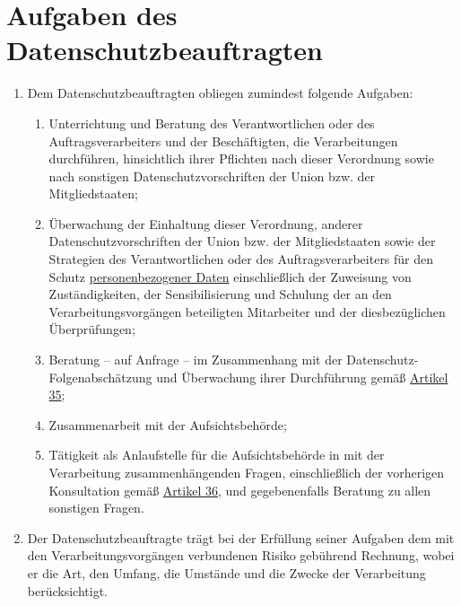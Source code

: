 \chapter{Aufgaben des Datenschutzbeauftragten}
\label{ch:39}


\begin{enumerate}

  \item Dem Datenschutzbeauftragten obliegen zumindest folgende Aufgaben:
  \label{itm:39-1}

  \begin{enumerate}
  
    \item Unterrichtung und Beratung des Verantwortlichen oder des Auftragsverarbeiters und der Beschäftigten, die
     Verarbeitungen durchführen, hinsichtlich ihrer Pflichten nach dieser Verordnung sowie nach sonstigen
     Datenschutzvorschriften der Union bzw. der Mitgliedstaaten;
    \label{itm:39-1a}

    \item Überwachung der Einhaltung dieser Verordnung, anderer Datenschutzvorschriften der Union bzw. der
     Mitgliedstaaten sowie der Strategien des Verantwortlichen oder des Auftragsverarbeiters für den Schutz
     \hyperref[itm:04-1]{personenbezogener Daten} einschließlich der Zuweisung von Zuständigkeiten, der Sensibilisierung und Schulung der an
     den Verarbeitungsvorgängen beteiligten Mitarbeiter und der diesbezüglichen Überprüfungen;
    \label{itm:39-1b}

    \item Beratung -- auf Anfrage -- im Zusammenhang mit der Datenschutz-Folgenabschätzung und Überwachung ihrer
     Durchführung gemäß \hyperref[ch:35]{Artikel 35};
    \label{itm:39-1c}

    \item Zusammenarbeit mit der Aufsichtsbehörde;
    \label{itm:39-1d}

    \item Tätigkeit als Anlaufstelle für die Aufsichtsbehörde in mit der Verarbeitung zusammenhängenden Fragen,
     einschließlich der vorherigen Konsultation gemäß \hyperref[ch:36]{Artikel 36}, und gegebenenfalls Beratung zu
     allen sonstigen Fragen.
    \label{itm:39-1e}

  \end{enumerate}

  \item Der Datenschutzbeauftragte trägt bei der Erfüllung seiner Aufgaben dem mit den Verarbeitungsvorgängen
   verbundenen Risiko gebührend Rechnung, wobei er die Art, den Umfang, die Umstände und die Zwecke der Verarbeitung
   berücksichtigt.
  \label{itm:39-e}

\end{enumerate}


